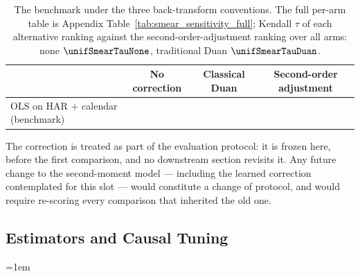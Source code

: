 \begin{table}[H]
\centering
\caption{The benchmark under the three back-transform conventions. The
full per-arm table is Appendix Table~\ref{tab:smear_sensitivity_full};
Kendall $\tau$ of each alternative ranking against the second-order-adjustment ranking
over all arms: none $\unifSmearTauNone$, traditional Duan
$\unifSmearTauDuan$.}
\label{tab:smear_sensitivity}
\small\setlength{\tabcolsep}{3pt}%
\begin{tabular}{@{}lccc@{}}
\toprule
 & No correction & Classical Duan & Second-order adjustment \\
\midrule
OLS on HAR $+$ calendar (benchmark) & \unifAzeroQLIKENone{} & \unifAzeroQLIKEDuan{} & \unifAzeroQLIKE{} \\
\bottomrule
\end{tabular}
\end{table}

The correction is treated as part of the evaluation protocol: it is frozen
here, before the first comparison, and no downstream section revisits it.
Any future change to the second-moment model --- including the learned
correction contemplated for this slot --- would constitute a change of
protocol, and would require re-scoring every comparison that inherited the
old one.
\fi

\subsection{Estimators and Causal Tuning}
\label{sec:estimators}

\begingroup{}\emergencystretch=1em
